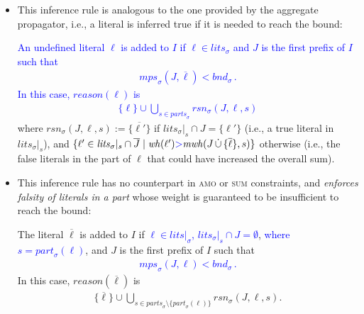 \documentclass[preprint,authoryear]{elsarticle}
\newcommand{\lits}{\mathit{lits}}
\newcommand{\mwh}{\mathit{mwh}}
\newcommand{\wh}{\mathit{wh}}
\newcommand{\mps}{\mathit{mps}}
\newcommand{\bnd}{\mathit{bnd}}
\newcommand{\cupdot}{\,\dot{\cup}\,}
\theoremstyle{definition}
\begin{document}
\begin{itemize}
    \item[\textcolor{blue}{\textbf{(RT)}}] This inference rule is analogous to the one provided by the aggregate propagator, i.e., a literal is inferred true if it is needed to reach the bound: 
    
    \textcolor{blue}{An undefined literal $\ell$ is added to $I$ if \textcolor{blue}{$\ell \in \lits_{\sigma}$} and  $J$ is the first prefix of $I$ such that
    \begin{align}\label{eq:amosum:propagation:true}
        \mps_{\sigma}(J,\overline{\ell}) < \bnd_\sigma\,.
    \end{align}
    In this case, $\mathit{reason}(\ell)$ is
    \begin{align}\label{eq:amosum:reason:rt}
    \{\ell\} \cup \bigcup_{s \in \mathit{parts}_\sigma}{
        \mathit{rsn}_\sigma(J,\ell,s)
    }
    \end{align}}
    where 
    $\mathit{rsn}_\sigma(J,\ell,s) := \{\overline{\ell'}\}$ if $\mathit{lits}_\sigma|_s \cap J = \{\ell'\}$ (i.e., a true literal in $\lits_\sigma|_s$), and
    $ \{\ell' \in \lits_{\sigma}|_s \cap \overline{J} \mid \wh(\ell') \textcolor{blue}{>} \mwh(J \cupdot \{ {\overline{\ell}} \}, s)\}$ otherwise (i.e., the false literals in the part of $\ell$ that could have increased the overall sum).
    \item[\textcolor{blue}{\textbf{(RF)}}] This inference rule has no counterpart in \textsc{amo} or \textsc{sum} constraints, and \emph{enforces falsity of literals in a part} whose weight is guaranteed to be insufficient to reach the bound: 
    
    The literal $\overline{\ell}$ is added to $I$ if \textcolor{blue}{$\ell \in \lits|_\sigma$, $\lits_{\sigma}|_s \cap J = \emptyset$}, \textcolor{blue}{where $s=\mathit{part}_\sigma(\ell)$}, and $J$ is the first prefix of $I$ such that
    \textcolor{blue}{\begin{align}\label{eq:amosum:propagation:false}
        \mps_{\sigma}(J,\ell) < \bnd_\sigma\, .
    \end{align}}
    In this case, $\mathit{reason}(\overline{\ell})$ is
    \begin{align}\label{eq:amosum:reason:rf}
    \{\overline{\ell}\} \cup \bigcup_{s \in \mathit{parts}_\sigma \setminus \{\mathit{part}_\sigma(\ell)\}}{
        \mathit{rsn}_\sigma(J,\ell,s)
    }.
    \end{align}
\end{itemize}
\end{document}
